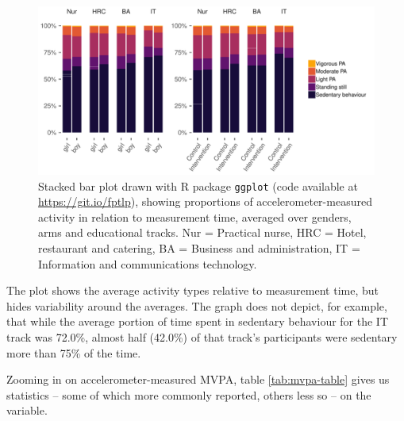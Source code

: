 \documentclass[english,man,floatsintext]{apa6}
\begin{document}
\begin{figure}
\centering
\includegraphics{_baseline-manuscript_files/figure-latex/average-day-activity-plot-1.pdf}
\caption{\label{fig:average-day-activity-plot}Stacked bar plot drawn with R package \texttt{ggplot} (code available at \url{https://git.io/fptlp}), showing proportions of accelerometer-measured activity in relation to measurement time, averaged over genders, arms and educational tracks. Nur = Practical nurse, HRC = Hotel, restaurant and catering, BA = Business and administration, IT = Information and communications technology.}
\end{figure}

The plot shows the average activity types relative to measurement time, but hides variability around the averages. The graph does not depict, for example, that while the average portion of time spent in sedentary behaviour for the IT track was 72.0\%, almost half (42.0\%) of that track's participants were sedentary more than 75\% of the time.

Zooming in on accelerometer-measured MVPA, table \ref{tab:mvpa-table} gives us statistics -- some of which more commonly reported, others less so -- on the variable.
\end{document}
